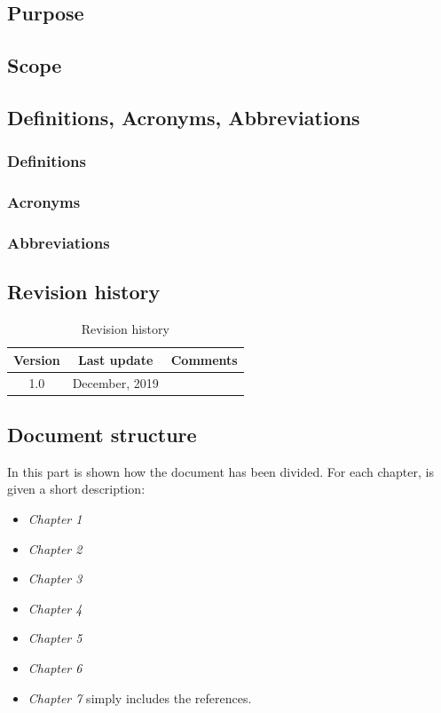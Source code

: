 \documentclass{article}
\begin{document}
		\subsection{Purpose}
		\subsection{Scope}
		\subsection{Definitions, Acronyms, Abbreviations}
			\subsubsection{Definitions}
			\subsubsection{Acronyms}
			\subsubsection{Abbreviations}
		\subsection{Revision history}
			\begin{table}[h]
				\centering
				\begin{tabular}{c c c}
					\hline
					\textbf{Version} & \textbf{Last update} & \textbf{Comments} \\ 
					\hline
					1.0 &  \nth{9} December, 2019  & \\
					\hline
				\end{tabular}
				\caption{Revision history}
				\label{fig:Revision history}
			\end{table}
		\subsection{Document structure}
			In this part is shown how the document has been divided. For each chapter, is given a short description:
			\begin{itemize}
				\item \textit{Chapter 1} 
				\item \textit{Chapter 2} 
				\item \textit{Chapter 3} 
				\item \textit{Chapter 4} 
				\item \textit{Chapter 5} 
				\item \textit{Chapter 6} 
				\item \textit{Chapter 7} simply includes the references.
			\end{itemize}
\end{document}
